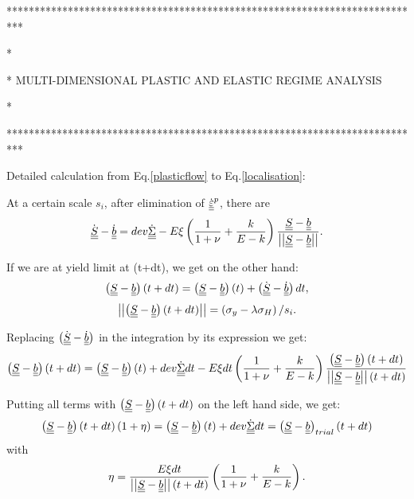 \clearpage
\noindent 
***************************************************************************

\noindent 
*

\noindent 
* MULTI-DIMENSIONAL PLASTIC AND ELASTIC REGIME ANALYSIS

\noindent 
*

\noindent
***************************************************************************

Detailed calculation from Eq.\eqref{plasticflow} to Eq.\eqref{localisation}:

At a certain scale $s_i$, after elimination of $ \dot{\uline{\uline{\varepsilon}}}^p$, there are 
$$\dot{\uline{\uline{S}}}- \dot{\uline{\uline{b}}}= dev\dot{\uline{\uline{\Sigma}}}-E\xi\left( \dfrac{1}{1+\nu}+\dfrac{k}{E-k}\right)\dfrac{\uline{\uline{S}}-\uline{\uline{b}}}{\left| \left|\uline{\uline{S}}-\uline{\uline{b}}\right| \right|}. $$

If we are at yield limit at (t+dt), we get on the other hand:
$$\left( \uline{\uline{S}}-\uline{\uline{b}}\right) (t+dt)=\left( \uline{\uline{S}}-\uline{\uline{b}}\right) (t)+\left( \dot{\uline{\uline{S}}}- \dot{\uline{\uline{b}}}\right) dt,$$
\begin{equation}\left| \left| \left( \uline{\uline{S}}-\uline{\uline{b}}\right) (t+dt)\right| \right| =\left( \sigma_y-\lambda \sigma_H\right)/s_i .
\end{equation}

Replacing $\left( \dot{\uline{\uline{S}}}-\dot{\uline{\uline{b}}}\right) $ in the integration by its expression we get:
\begin{equation}
\left( \uline{\uline{S}}-\uline{\uline{b}}\right) (t+dt)=\left( \uline{\uline{S}}-\uline{\uline{b}}\right) (t)+dev\dot{\uline{\uline{\Sigma}}}dt-E\xi dt\left(\dfrac{1}{1+\nu}+\dfrac{k}{E-k} \right) \dfrac{\left( \uline{\uline{S}}-\uline{\uline{b}}\right) (t+dt)}{\left| \left|\uline{\uline{S}}-\uline{\uline{b}}\right| \right| (t+dt)}
\end{equation}

Putting all terms with $ \left( \uline{\uline{S}}-\uline{\uline{b}}\right) (t+dt)$ on the left hand side, we get:
\begin{equation}
\left( \uline{\uline{S}}-\uline{\uline{b}}\right) (t+dt)\left(  1+\eta\right) =\left( \uline{\uline{S}}-\uline{\uline{b}}\right) (t)+dev\dot{\uline{\uline{\Sigma}}}dt=\left( \uline{\uline{S}}-\uline{\uline{b}}\right)_{trial} (t+dt)
\label{eqyield}
\end{equation}
with\begin{equation}\eta=\dfrac{E\xi dt}{\left| \left|\uline{\uline{S}}-\uline{\uline{b}}\right| \right|(t+dt)}\left(\dfrac{1}{1+\nu}+\dfrac{k}{E-k} \right).
\label{eta}
\end{equation}

